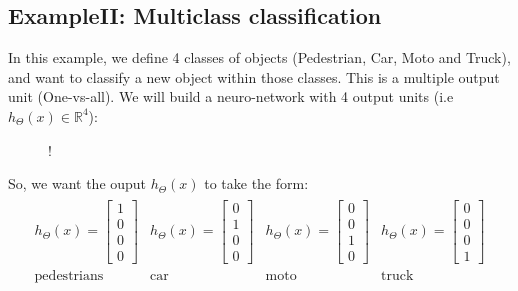 \documentclass[a4paper,12pt]{report}
\begin{document}
\subsection{ExampleII: Multiclass classification}
In this example, we define 4 classes of objects (Pedestrian, Car, Moto and Truck), and want to classify a new object within those classes. This is a multiple output unit (One-vs-all).
We will build a neuro-network with 4 output units (i.e $h_{\Theta}(x) \in \mathbb{R}^4$):
\begin{figure}[H]
        \centering
        \resizebox {0.5in} {!} {
}
\end{figure}
So, we want the ouput $h_{\Theta}(x)$ to take the form: 
\begin{align*}
\begin{array}{llll}
h_{\Theta}(x) =\left[ \begin{smallmatrix} 1 \\ 0 \\ 0 \\ 0 \end{smallmatrix} \right]  & h_{\Theta}(x)=\left[ \begin{smallmatrix} 0 \\ 1 \\ 0 \\ 0 \end{smallmatrix} \right] & h_{\Theta}(x)=\left[ \begin{smallmatrix} 0 \\ 0 \\ 1 \\ 0 \end{smallmatrix} \right] & h_{\Theta}(x)=\left[ \begin{smallmatrix} 0 \\ 0 \\ 0 \\ 1 \end{smallmatrix} \right] \\
\mathrm{pedestrians} & \mathrm{car} & \mathrm{moto} & \mathrm{truck} \\
\end{array}
\end{align*}
\end{document}

